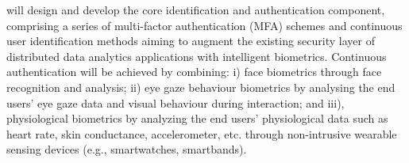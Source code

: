\begin{Workpackage}{\thewpno}
\begin{Task}
\end{Task}

\begin{Task}
\TaskResults{%
\ref{del:auth2},
\ref{del:auth3},
\ref{del:auth4}
}
\TaskHeader{}

\theTask{} will design and develop the core identification and authentication component, comprising a series of multi-factor authentication (MFA) schemes and continuous user identification methods aiming to augment the existing security layer of distributed data analytics applications with intelligent biometrics. Continuous authentication will be achieved by combining: i) face biometrics through face recognition and analysis; ii) eye gaze behaviour biometrics by analysing the end users' eye gaze data and visual behaviour during interaction; and iii), physiological biometrics by analyzing the end users' physiological data such as heart rate, skin conductance, accelerometer, etc. through non-intrusive wearable sensing devices (e.g., smartwatches, smartbands). 
\taskbreak

\end{Task}
\end{Workpackage}
